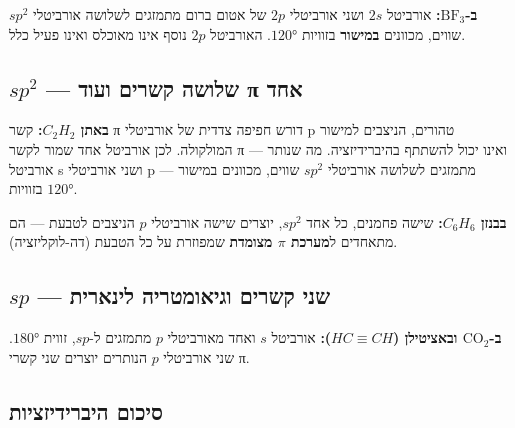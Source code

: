 \documentclass[
  hebrew,
  letterpaper,
  DIV=11,
  numbers=noendperiod]{scrreprt}
\begin{document}
\textbf{ב-\(\text{BF}_3\):} אורביטל \(2s\) ושני אורביטלי \(2p\) של אטום
ברום מתמזגים לשלושה אורביטלי \(sp^2\) שווים, מכוונים \textbf{במישור}
בזוויות \(120°\). האורביטל \(2p\) נוסף אינו מאוכלס ואינו פעיל כלל.

\subsection{\texorpdfstring{\(sp^2\) --- שלושה קשרים ועוד π
אחד}{sp\^{}2 --- שלושה קשרים ועוד π אחד}}\label{sp2-ux5e9ux5dcux5d5ux5e9ux5d4-ux5e7ux5e9ux5e8ux5d9ux5dd-ux5d5ux5e2ux5d5ux5d3-ux3c0-ux5d0ux5d7ux5d3}

\textbf{באתן \(C_2H_2\):} קשר π דורש חפיפה צדדית של אורביטלי p טהורים,
הניצבים למישור המולקולה. לכן אורביטל אחד שמור לקשר π ואינו יכול להשתתף
בהיברידיזציה. מה שנותר --- אורביטל s ושני אורביטלי p --- מתמזגים לשלושה
אורביטלי \(sp^2\) שווים, מכוונים במישור בזוויות \(120°\).

\textbf{בבנזן \(C_6H_6\):} שישה פחמנים, כל אחד \(sp^2\), יוצרים שישה
אורביטלי \(p\) הניצבים לטבעת --- הם מתאחדים ל\textbf{מערכת \(\pi\)
מצומדת} שמפוזרת על כל הטבעת (דה-לוקליזציה).

\subsection{\texorpdfstring{\(sp\) --- שני קשרים וגיאומטריה
לינארית}{sp --- שני קשרים וגיאומטריה לינארית}}\label{sp-ux5e9ux5e0ux5d9-ux5e7ux5e9ux5e8ux5d9ux5dd-ux5d5ux5d2ux5d9ux5d0ux5d5ux5deux5d8ux5e8ux5d9ux5d4-ux5dcux5d9ux5e0ux5d0ux5e8ux5d9ux5ea}

\textbf{ב-\(\text{CO}_2\) ובאציטילן (\({HC}\equiv {CH}\)):} אורביטל
\(s\) ואחד מאורביטלי \(p\) מתמזגים ל-\(sp\), זווית \(180°\). שני
אורביטלי \(p\) הנותרים יוצרים שני קשרי π.

\subsection{סיכום
היברידיזציות}\label{ux5e1ux5d9ux5dbux5d5ux5dd-ux5d4ux5d9ux5d1ux5e8ux5d9ux5d3ux5d9ux5d6ux5e6ux5d9ux5d5ux5ea}
\end{document}
